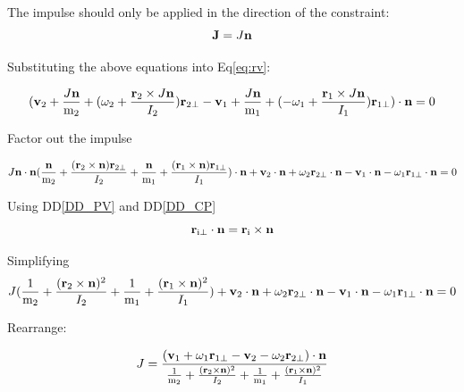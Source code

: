 \documentclass[12pt]{article}
\begin{document}
\noindent
The impulse should only be applied in the direction of the constraint: 
\begin{equation}
\textbf J = J\textbf n \label{eq:imp}
\end{equation}

\noindent
Substituting the above equations into Eq\ref{eq:rv}:

\begin{equation*}
(\textbf v_\text{2} + \frac{J\textbf n}{ \textnormal m_\text{2}} + 
( \omega_\text{2} + \frac{\textbf r_\text{2} \times  J\textbf n}{
I_\text{2}})\textbf r_\text{2$\perp$} -
\textbf v_\text{1} + \frac{  J\textbf n}{ \textnormal m_\text{1}} +  
( - \omega_\text{1} + \frac{\textbf r_\text{1} \times 
J\textbf n}{I_\text{1}})\textbf r_\text{1$\perp$}) \cdot \textbf n = 0
\end{equation*}

\noindent
Factor out the impulse 

\begin{equation*}
J\textbf n \cdot \textbf n (\frac{\textbf n}{ \textnormal m_\text{2}} + \frac{(\textbf r_\text{2} \times
\textbf n) \textbf r_\text{2$\perp$} }{I_\text{2}} + \frac{\textbf n}{
\textnormal m_\text{1}} + \frac{(\textbf r_\text{1} \times \textbf n) \textbf
r_\text{1$\perp$} }{I_\text{1}} ) \cdot \textbf n +
\textbf v_\text{2}\cdot \textbf n + \omega_\text{2}\textbf r_\text{2$\perp$}
\cdot \textbf n -
\textbf v_\text{1} \cdot \textbf n - \omega_\text{1}\textbf r_\text{1$\perp$}
\cdot \textbf n= 0
\end{equation*}

\noindent
Using DD\ref{DD_PV} and DD\ref{DD_CP}
\begin{equation*}
\textbf r_\text{i$\perp$} \cdot \textbf n = \textbf r_\text{i} \times \textbf n
\end{equation*}

\noindent
Simplifying
\begin{equation*}
J (\frac{1}{ \textnormal m_\text{2}} + \frac{(\textbf r_\text{2} \times \textbf
n)^{2} }{I_\text{2}} + \frac{1}{ \textnormal m_\text{1}} + \frac{(\textbf
r_\text{1} \times \textbf n) ^{2}}{I_\text{1}} )+
\textbf v_\text{2}\cdot \textbf n + \omega_\text{2}\textbf r_\text{2$\perp$}
\cdot \textbf n -
\textbf v_\text{1} \cdot \textbf n - \omega_\text{1}\textbf r_\text{1$\perp$}
\cdot \textbf n= 0
\end{equation*}

\noindent
Rearrange: 

\begin{equation*}
J =\frac{( \textbf v_\text{1} + \omega_\text{1}\textbf r_\text{1$\perp$} -
\textbf v_\text{2}
 - \omega_\text{2}\textbf r_\text{2$\perp$} ) \cdot \textbf n}
{\frac{1}{ \textnormal m_\text{2}} + \frac{(\textbf r_\text{2} \times\textbf n)
^{2}}{I_\text{2}} + \frac{1}{ \textnormal m_\text{1}} + \frac{(\textbf
r_\text{1} \times \textbf n) ^{2}}{I_\text{1}}}
\end{equation*}
\end{document}
